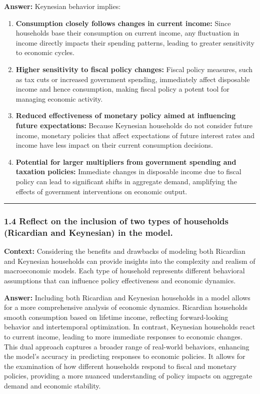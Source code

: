 \documentclass{article}
\begin{document}
\textbf{Answer:} 
Keynesian behavior implies:
\begin{enumerate}
    \item \textbf{Consumption closely follows changes in current income:} Since households base their consumption on current income, any fluctuation in income directly impacts their spending patterns, leading to greater sensitivity to economic cycles.
    \item \textbf{Higher sensitivity to fiscal policy changes:} Fiscal policy measures, such as tax cuts or increased government spending, immediately affect disposable income and hence consumption, making fiscal policy a potent tool for managing economic activity.
    \item \textbf{Reduced effectiveness of monetary policy aimed at influencing future expectations:} Because Keynesian households do not consider future income, monetary policies that affect expectations of future interest rates and income have less impact on their current consumption decisions.
    \item \textbf{Potential for larger multipliers from government spending and taxation policies:} Immediate changes in disposable income due to fiscal policy can lead to significant shifts in aggregate demand, amplifying the effects of government interventions on economic output.
\end{enumerate}

\noindent\rule{\linewidth}{0.5pt}

\subsubsection*{1.4 Reflect on the inclusion of two types of households (Ricardian and Keynesian) in the model.}

\textbf{Context:} Considering the benefits and drawbacks of modeling both Ricardian and Keynesian households can provide insights into the complexity and realism of macroeconomic models. Each type of household represents different behavioral assumptions that can influence policy effectiveness and economic dynamics.

\textbf{Answer:} 
Including both Ricardian and Keynesian households in a model allows for a more comprehensive analysis of economic dynamics. Ricardian households smooth consumption based on lifetime income, reflecting forward-looking behavior and intertemporal optimization. In contrast, Keynesian households react to current income, leading to more immediate responses to economic changes. This dual approach captures a broader range of real-world behaviors, enhancing the model's accuracy in predicting responses to economic policies. It allows for the examination of how different households respond to fiscal and monetary policies, providing a more nuanced understanding of policy impacts on aggregate demand and economic stability.
\end{document}
